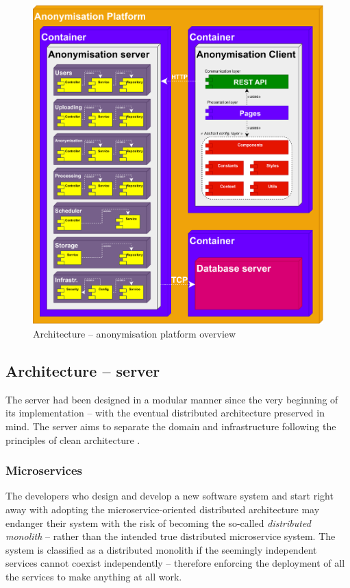 \documentclass[a4paper,twoside,12pt]{book}
\begin{document}
\begin{figure}
  \centering
  \includegraphics[width=\linewidth]{img/architecture_platform.png}
  \caption{Architecture – anonymisation platform overview}
  \label{fig:architecture_platform}
\end{figure}

\subsection{Architecture -- server}

The server had been designed in a modular manner since the very beginning of its implementation -- with the eventual distributed architecture preserved in mind. The server aims to separate the domain and infrastructure following the principles of clean architecture \cite{bib:clean_architecture}.

\subsubsection{Microservices}

The developers who design and develop a new software system and start right away with adopting the microservice-oriented distributed architecture may endanger their system with the risk of becoming the so-called \textit{distributed monolith} -- rather than the intended true distributed microservice system. The system is classified as a distributed monolith if the seemingly independent services cannot coexist independently -- therefore enforcing the deployment of all the services to make anything at all work.
\end{document}
